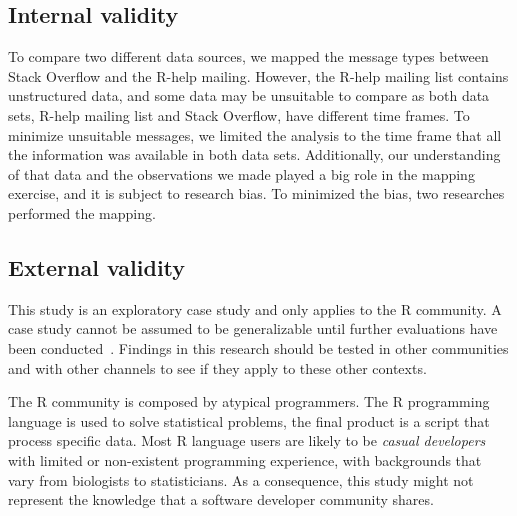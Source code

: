 \subsection{Internal validity}

    To compare two different data sources, we mapped the message types between Stack Overflow and the R-help mailing.
    However, the R-help mailing list contains unstructured data, and some data may be unsuitable to compare as both data sets, R-help mailing list and Stack Overflow, have different time frames.
    To minimize unsuitable messages, we limited the analysis to the time frame that all the information was available in both data sets.
    Additionally, our understanding of that data and the observations we made played a big role in the mapping exercise, and it is subject to research bias.
    To minimized the bias, two researches performed the mapping.

\subsection{External validity}

    This study is an exploratory case study and only applies to the R community.
    A case study cannot be assumed to be generalizable until further evaluations have been conducted~\cite{Yin2009}.
    Findings in this research should be tested in other communities and with other channels to see if they apply to these other contexts.

    The R community is composed by atypical programmers.
    The R programming language is used to solve statistical problems, the final product is a script that process specific data.
    Most R language users are likely to be \textit{casual developers} with limited or non-existent programming experience, with backgrounds that vary from biologists to statisticians.
    As a consequence, this study might not represent the knowledge that a software developer community shares.

